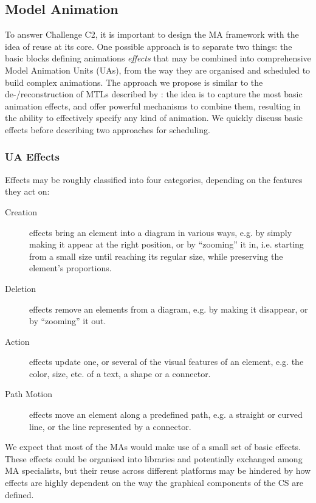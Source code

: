 \subsection{Model Animation}
\label{sec:MA}

To answer Challenge C2, it is important to design the MA framework with
the idea of reuse at its core. One possible approach is to separate two
things: the basic blocks defining animations \emph{effects} that may be combined
into comprehensive Model Animation Units (UAs), from the way they are organised
and scheduled to build complex animations. The approach we propose is similar
to the de-/reconstruction of MTLs described by \citet{J:SyrianiVangheluwe:2013}:
the idea is to capture the most basic animation effects, and offer powerful 
mechanisms to combine them, resulting in the ability to effectively specify any
kind of animation. We quickly discuss basic effects before describing two
approaches for scheduling.



\subsubsection{UA Effects}
\label{sec:MA-Effects}

Effects may be roughly classified into four categories, depending on the features
they act on:
\begin{description}
   \item[Creation] effects bring an element into a diagram in various ways, e.g. by
   simply making it appear at the right position, or by ``zooming'' it in, i.e.
   starting from a small size until reaching its regular size, while preserving 
   the element's proportions.
   
   \item[Deletion] effects remove an elements from a diagram, e.g. by making it
   disappear, or by ``zooming'' it out. 
   
   \item[Action] effects update one, or several of the visual features of an
   element, e.g. the color, size, etc. of a text, a shape or a connector.
   
   \item[Path Motion] effects move an element along a predefined path, e.g. a
   straight or curved line, or the line represented by a connector.
\end{description}
We expect that most of the MAs would make use of a small set of basic effects. 
These effects could be organised into libraries and potentially exchanged among
MA specialists, but their reuse across different platforms may be hindered by how
effects are highly dependent on the way the graphical components of the CS are
defined.

